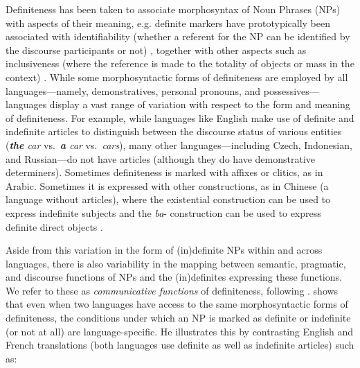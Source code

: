 \documentclass[11pt,letterpaper]{article}
\newcommand{\llbl}[1]{\mbox{\textsc{#1}}} %
\begin{document}
Definiteness has been taken to associate morphosyntax of Noun Phrases (NPs) with aspects of their meaning, e.g. definite markers have prototypically been associated with identifiability
(whether a referent for the NP can be identified by the discourse participants or not) \citep{lyons99}, together with other aspects such as inclusiveness (where the reference is made to the totality of objects or mass in the context) \citep{hawkins78}. 
While some morphosyntactic forms of definiteness are employed by all languages---namely, 
demonstratives, personal pronouns, and possessives---languages display a vast range of variation with respect to 
the form and meaning of definiteness. 
For example, while languages like English make use of definite and indefinite articles 
to distinguish between the discourse status of various entities ({\it \textbf{the} car} vs.~{\it \textbf{a} car} vs.~{\it cars}), 
many other languages---including Czech, Indonesian, and Russian---do not have articles
(although they do have demonstrative determiners).  
Sometimes definiteness is marked with affixes or clitics, as in Arabic. Sometimes it is expressed with other constructions,
as in Chinese (a language without articles), where the existential construction can be used to express indefinite subjects 
and the {\it ba}- construction can be used to express definite direct objects \citep{chen04}. 

Aside from this variation in the form of (in)definite NPs within and across languages, there is also variability 
in the mapping between semantic, pragmatic, and discourse %
functions of NPs and the (in)definites expressing these functions.   
We refer to these as {\em communicative functions} of definiteness, following \cite{bhatia14}.  
 shows that even when two languages have access to the same morphosyntactic forms of definiteness, the conditions under which an NP 
is marked as definite or indefinite (or not at all) 
are language-specific. He illustrates this by contrasting English and French translations (both languages use definite as well as indefinite articles) such as:
\end{document}
